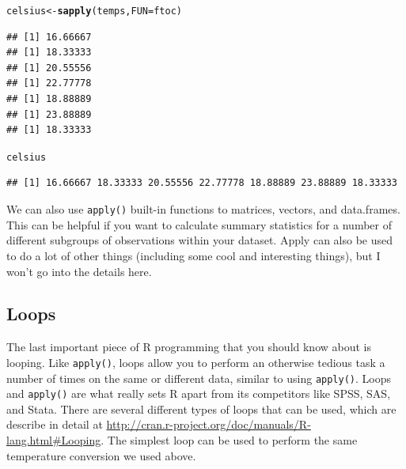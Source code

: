 \documentclass[12pt]{article}\usepackage[]{graphicx}\usepackage[]{color}
\makeatletter
\newcommand{\hlstd}[1]{\textcolor[rgb]{0.345,0.345,0.345}{#1}}%
\newcommand{\hlkwb}[1]{\textcolor[rgb]{0.69,0.353,0.396}{#1}}%
\newcommand{\hlkwc}[1]{\textcolor[rgb]{0.333,0.667,0.333}{#1}}%
\newcommand{\hlkwd}[1]{\textcolor[rgb]{0.737,0.353,0.396}{\textbf{#1}}}%
\newenvironment{kframe}{%
 \def\at@end@of@kframe{}%
 \ifinner\ifhmode%
  \def\at@end@of@kframe{\end{minipage}}%
  \begin{minipage}{\columnwidth}%
 \fi\fi%
 \def\FrameCommand##1{\hskip\@totalleftmargin \hskip-\fboxsep
 \colorbox{shadecolor}{##1}\hskip-\fboxsep
     \hskip-\linewidth \hskip-\@totalleftmargin \hskip\columnwidth}%
 \MakeFramed {\advance\hsize-\width
   \@totalleftmargin\z@ \linewidth\hsize
   \@setminipage}}%
 {\par\unskip\endMakeFramed%
 \at@end@of@kframe}
\newenvironment{knitrout}{}{} %
\makeatother
\begin{document}
\begin{knitrout}
\color{fgcolor}\begin{kframe}
\begin{alltt}
\hlstd{celsius} \hlkwb{<-} \hlkwd{sapply}\hlstd{(temps,}\hlkwc{FUN}\hlstd{=ftoc)}
\end{alltt}
\begin{verbatim}
## [1] 16.66667
## [1] 18.33333
## [1] 20.55556
## [1] 22.77778
## [1] 18.88889
## [1] 23.88889
## [1] 18.33333
\end{verbatim}
\begin{alltt}
\hlstd{celsius}
\end{alltt}
\begin{verbatim}
## [1] 16.66667 18.33333 20.55556 22.77778 18.88889 23.88889 18.33333
\end{verbatim}
\end{kframe}
\end{knitrout}
We can also use \texttt{apply()} built-in functions to matrices, vectors, and data.frames. This can be helpful if you want to calculate summary statistics for a number of different subgroups of observations within your dataset. Apply can also be used to do a lot of other things (including some cool and interesting things), but I won't go into the details here.

\subsection{Loops}
The last important piece of R programming that you should know about is looping. Like \texttt{apply()}, loops allow you to perform an otherwise tedious task a number of times on the same or different data, similar to using \texttt{apply()}. Loops and \texttt{apply()} are what really sets R apart from its competitors like SPSS, SAS, and Stata. There are several different types of loops that can be used, which are describe in detail at \url{http://cran.r-project.org/doc/manuals/R-lang.html#Looping}. The simplest loop can be used to perform the same temperature conversion we used above.
\end{document}
